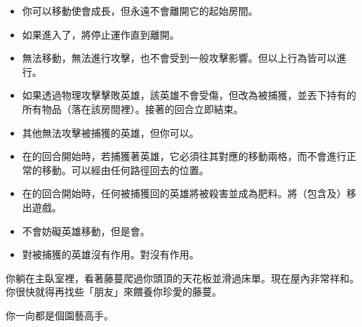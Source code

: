 \vspace*{-1em}
\begin{itemize}
  \item 你可以移動使會成長，但永遠不會離開它的起始房間。
  \item 如果進入了，將停止運作直到離開。
\end{itemize}

\vspace*{-1em}
\begin{itemize}
  \item {}無法移動，無法進行攻擊，也不會受到一般攻擊影響。但以上行為皆可以進行。
  \item 如果透過物理攻擊擊敗英雄，該英雄不會受傷，但改為被捕獲，並丟下持有的所有物品（落在該房間裡）。接著的回合立即結束。
  \item 其他無法攻擊被捕獲的英雄，但你可以。
  \item 在的回合開始時，若捕獲著英雄，它必須往其對應的移動兩格，而不會進行正常的移動。可以經由任何路徑回去的位置。
  \item 在的回合開始時，任何被捕獲回的英雄將被殺害並成為肥料。將（包含及）移出遊戲。
  \item {}不會妨礙英雄移動，但是會。
  \item {}對被捕獲的英雄沒有作用。對沒有作用。
\end{itemize}

\begin{HauntStory}
  你躺在主臥室裡，看著藤蔓爬過你頭頂的天花板並滑過床單。現在屋內非常祥和。你很快就得再找些「朋友」來餵養你珍愛的藤蔓。

  你一向都是個園藝高手。
\end{HauntStory}
